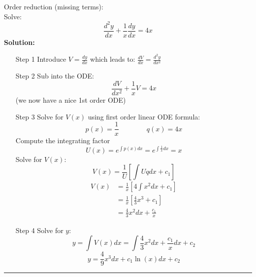 \begin{exmp}{Order reduction (missing terms):}\\
Solve:
\begin{equation*}
\frac{d^2y}{dx}+\frac{1}{x}\frac{dy}{dx}=4x
\end{equation*}
\textbf{Solution:}\\
\begin{itemize}
\item[Step 1] Introduce $V= \frac{dy}{dx}$ which leads to: $\frac{dV}{dx}= \frac{d^2y}{dx^2}$ 
\item[Step 2]  Sub into the ODE:
\begin{equation*}
\frac{dV}{dx^2}+\frac{1}{x}V=4x
\end{equation*}
(we now have a nice 1st order ODE)
\item[Step 3] Solve for $V(x)$ using first order linear ODE formula:
\begin{equation*}
p(x)=\frac{1}{x}\qquad \qquad q(x) = 4x
\end{equation*}
Compute the integrating factor
\begin{equation*}
U(x)=e^{\int p(x) dx}=e^{\int \frac{1}{x} dx}=x
\end{equation*}
Solve for $V(x)$:
\begin{equation*}
V(x)=\frac{1}{U}\left[\int U q dx + c_1\right]
\end{equation*}
\begin{eqnarray*}
V(x)&=\frac{1}{x}\left[4\int x^2  dx + c_1\right]\\
&=\frac{1}{x}\left[\frac{4}{3} x^3  + c_1\right]\\
&=\frac{4}{3} x^2  dx + \frac{c_1}{x}
\end{eqnarray*}
\item[Step 4] Solve for $y$:
\begin{equation*}
y=\int V(x) dx=\int \frac{4}{3} x^2  dx + \frac{c_1}{x} dx +c_2
\end{equation*}
\begin{equation*}
y= \frac{4}{9} x^3  dx + c_1\ln{(x)} dx +c_2
\end{equation*}
\end{itemize}
\end{exmp}



\begin{center}
\noindent\rule{4cm}{0.4pt}
\end{center}


